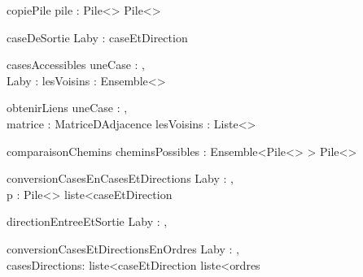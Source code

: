 \begin{algorithme}
    \signaturefonction
        {copiePile}
        {pile : Pile<{\naturelNonNul}>}
        {Pile<{\naturelNonNul}>}
\end{algorithme}

\begin{algorithme}
    \signaturefonction
        {caseDeSortie}
        {Laby : {\Labyrinthe}}
        {caseEtDirection}
\end{algorithme}

\begin{algorithme}
    \signaturefonction
        {casesAccessibles}
        {uneCase : {\naturelNonNul}, \\ 
         Laby : {\Labyrinthe}}
        {lesVoisins : Ensemble<{\naturelNonNul}>}
\end{algorithme}

\begin{algorithme}
    \signaturefonction
        {obtenirLiens}
        {uneCase : {\naturelNonNul}, \\ 
         matrice : {MatriceDAdjacence}}
        {lesVoisins : Liste<{\naturelNonNul}>}
\end{algorithme}

\begin{algorithme}
    \signaturefonction
        {comparaisonChemins}
        {cheminsPossibles : Ensemble<Pile<{\naturelNonNul}> >}
        {Pile<{\naturelNonNul}>}
\end{algorithme}

\begin{algorithme}
    \signaturefonction
        {conversionCasesEnCasesEtDirections}
        {Laby : {\Labyrinthe}, \\ 
         p : Pile<{\naturelNonNul}>}
        {liste<{caseEtDirection}}
\end{algorithme}

\begin{algorithme}
    \signaturefonction
        {directionEntreeEtSortie}
        {Laby : {\Labyrinthe}}
        {\direction, \direction}
\end{algorithme}

\begin{algorithme}
    \signaturefonction
        {conversionCasesEtDirectionsEnOrdres}
        {Laby : {\Labyrinthe}, \\ 
         casesDirections: liste<{caseEtDirection}}
        {liste<{ordres}}
\end{algorithme}

